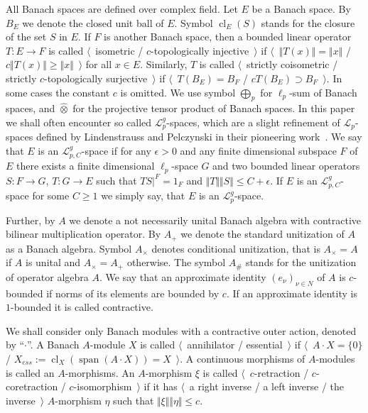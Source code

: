 \documentclass[12pt]{article}
\newcommand{\projtens}{\mathbin{\widehat{\otimes}}}
\begin{document}
All Banach spaces are defined over complex field. Let $E$ be a Banach space. By
$B_E$ we denote the closed unit ball of $E$. Symbol $\operatorname{cl}_E(S)$
stands for the closure of the set $S$ in $E$. If $F$ is another Banach space,
then a bounded linear operator $T:E\to F$ is called $\langle$~isometric /
$c$-topologically injective~$\rangle$ if $\langle$~$\Vert T(x)\Vert=\Vert
x\Vert$ / $c\Vert T(x)\Vert\geq\Vert x\Vert$~$\rangle$ for all $x\in E$.
Similarly, $T$ is called $\langle$~strictly coisometric / strictly
$c$-topologically surjective~$\rangle$ if $\langle$~$T(B_E)=B_F$ / $c
T(B_E)\supset B_F$~$\rangle$. In some cases the constant $c$ is omitted. We use
symbol $\bigoplus_p$ for $\ell_p$-sum of Banach spaces, and $\projtens$ for the
projective tensor product of Banach spaces. In this paper we shall often
encounter so called $\mathcal{L}_p^g$-spaces, which are a slight refinement of
$\mathcal{L}_p$-spaces defined by Lindenstrauss and Pelczynski in their
pioneering work~\cite{LinPelAbsSumOpInLpSpAndApp}. We say that $E$ is an
$\mathcal{L}_{p,C}^g$-space if for any $\epsilon>0$ and any finite dimensional
subspace $F$ of $E$ there exists a finite dimensional $\ell_p$-space $G$ and two
bounded linear operators $S:F\to G$, $T:G\to E$ such that $TS|^F=1_F$ and $\Vert
T\Vert\Vert S\Vert\leq C+\epsilon$. If $E$ is an $\mathcal{L}_{p,C}^g$-space for
some $C\geq 1$ we simply say, that $E$ is an $\mathcal{L}_p^g$-space.

Further, by $A$ we denote a not necessarily unital Banach algebra with
contractive bilinear multiplication operator. By $A_+$ we denote the standard
unitization of $A$ as a Banach algebra. Symbol $A_\times$ denotes conditional
unitization, that is $A_\times=A$ if $A$ is unital and $A_\times=A_+$ otherwise.
The symbol $A_\#$ stands for the unitization of operator algebra $A$. We say
that an approximate identity ${(e_\nu)}_{\nu\in N}$ of $A$ is $c$-bounded if
norms of its elements are bounded by $c$. If an approximate identity is
$1$-bounded it is called contractive.

We shall consider only Banach modules with a contractive outer action, denoted
by ``$\cdot$''. A Banach $A$-module $X$ is called $\langle$~annihilator /
essential~$\rangle$ if $\langle$~$A\cdot X= \{0 \}$ /
$X_{ess}:=\operatorname{cl}_X(\operatorname{span}(A\cdot X))=X$~$\rangle$. A
continuous morphisms of $A$-modules is called an $A$-morphisms. An $A$-morphism
$\xi$ is called $\langle$~$c$-retraction / $c$-coretraction /
$c$-isomorphism~$\rangle$ if it has $\langle$~a right inverse / a left inverse /
the inverse~$\rangle$ $A$-morphism $\eta$ such that
$\Vert\xi\Vert\Vert\eta\Vert\leq c$.
\end{document}
